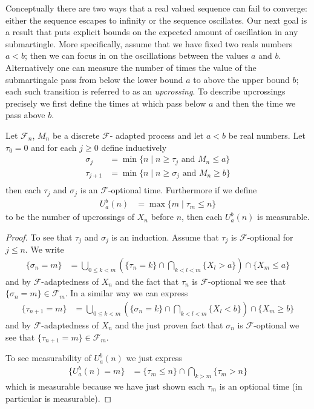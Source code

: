 Conceptually there are two ways that a real valued sequence can fail
to converge: either the sequence escapes to infinity or the sequence
oscillates.  Our next goal is a result that puts explicit bounds on
the expected amount of oscillation in any submartingle. More
specifically, 
assume that we have fixed two reals numbers $a < b$; then
we can focus in on the oscillations between the values $a$ and $b$.
Alternatively one can measure the number of times the value of the
submartingale pass from below the lower bound $a$ to above the upper
bound $b$; each such transition is referred to as an
\emph{upcrossing}.  To describe upcrossings precisely we first define
the times at which pass below $a$ and then the time we pass above $b$.
\begin{lem}Let $\mathcal{F}_n$, $M_n$ be a discrete $\mathcal{F}$-
  adapted process and let $a<b$ be real numbers.  Let $\tau_0 =0$ and for each $j \geq 0$ define
  inductively
\begin{align*}
\sigma_j &= \min \lbrace n \mid n \geq \tau_j \text{ and } M_n \leq a
\rbrace \\
\tau_{j+1} &= \min \lbrace n \mid n \geq \sigma_j \text{ and } M_n
\geq b \rbrace \\
\end{align*}
then each $\tau_j$ and $\sigma_j$ is an $\mathcal{F}$-optional time.
Furthermore if we define 
\begin{align*}
U_a^b(n) &= \max \lbrace m \mid \tau_m \leq n \rbrace
\end{align*}
to be the number of upcrossings of $X_n$ before $n$, then each $U_a^b(n)$
is measurable.
\end{lem}
\begin{proof}
To see that $\tau_j$ and $\sigma_j$ is an induction.  Assume that
$\tau_j$ is $\mathcal{F}$-optional for $j \leq n$.  We write
\begin{align*}
\lbrace \sigma_n = m \rbrace &= \bigcup_{0\leq k<m} \left ( \lbrace \tau_n = k \rbrace
\cap \bigcap_{k < l < m} \lbrace X_l > a\rbrace\right) \cap \lbrace X_m \leq a\rbrace
\end{align*}
and by $\mathcal{F}$-adaptedness of $X_n$ and the fact
that $\tau_n$ is $\mathcal{F}$-optional we see that $\lbrace
\sigma_n = m \rbrace \in \mathcal{F}_m$.  In a similar way we can
express
\begin{align*}
\lbrace \tau_{n+1} = m \rbrace &= \bigcup_{0\leq k<m} \left ( \lbrace \sigma_n = k \rbrace
\cap \bigcap_{k < l < m} \lbrace X_l < b \rbrace\right) \cap \lbrace
X_m \geq b \rbrace
\end{align*}
and by $\mathcal{F}$-adaptedness of $X_n$ and the just
proven fact
that $\sigma_n$ is $\mathcal{F}$-optional we see that $\lbrace
\tau_{n+1} = m \rbrace \in \mathcal{F}_m$.

To see measurability of $U_a^b(n)$ we just express
\begin{align*}
\lbrace U_a^b(n) = m \rbrace &= \lbrace \tau_m \leq n\rbrace \cap
\bigcap_{k>m} \lbrace \tau_m > n\rbrace
\end{align*}
which is measurable because we have just shown each $\tau_m$ is an
optional time (in particular is measurable).
\end{proof}



